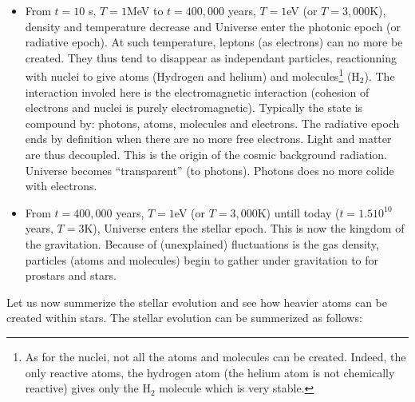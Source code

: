 \documentclass[12pt]{book}
\begin{document}
\begin{itemize}
\item From $t=10$ s, $T=1$MeV to $t=400,000$ years, $T=1$eV (or
$T=3,000$K), density and temperature decrease and Universe enter the photonic
epoch (or radiative epoch). At such temperature, leptons (as
electrons) can no more be created. They thus tend to disappear as
independant particles, reactionning with nuclei to give
atoms (Hydrogen and helium) and molecules\footnote{%
As for the nuclei, not all the atoms and molecules can be
created. Indeed, the only reactive atoms, the hydrogen atom (the
helium atom is not chemically reactive) gives only the H$_2$ molecule
which is very stable.}%
 (H$_2$). The
interaction involed here is the electromagnetic interaction (cohesion
of electrons and nuclei is purely electromagnetic). Typically the
state is compound by: photons, atoms, molecules and electrons. The
radiative epoch ends by definition when there are no more free electrons.
Light and matter are thus decoupled. This is the origin of the cosmic
background radiation. Universe becomes ``transparent'' (to
photons). Photons does no more colide with electrons.
\item From $t=400,000$ years, $T=1$eV (or
$T=3,000$K) untill today ($t=1.5 10^{10}$ years, $T=3$K), Universe
enters the stellar epoch. This is now the kingdom of the
gravitation. Because of (unexplained) fluctuations is the gas density,
particles (atoms and molecules) begin to gather under gravitation to
for prostars and stars.
\end{itemize}
Let us now summerize the stellar evolution and see how heavier atoms
can be created within stars.
The stellar evolution can be summerized as follows:
\end{document}
